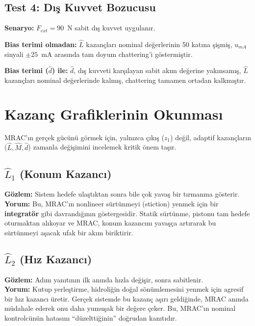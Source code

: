 \documentclass[12pt,a4paper]{article}
\begin{document}
\subsection{Test 4: Dış Kuvvet Bozucusu}

\textbf{Senaryo:} $F_{ext} = 90$~N sabit dış kuvvet uygulanır.

\textbf{Bias terimi olmadan:} $\hat{L}$ kazançları nominal değerlerinin 50 katına şişmiş, $u_{mA}$ sinyali $\pm 25$~mA arasında tam doyum chattering'i göstermiştir.

\textbf{Bias terimi ($\hat{d}$) ile:} $\hat{d}$, dış kuvveti karşılayan sabit akım değerine yakınsamış, $\hat{L}$ kazançları nominal değerlerinde kalmış, chattering tamamen ortadan kalkmıştır.

\section{Kazanç Grafiklerinin Okunması}
\label{sec:gain_analysis}

MRAC'ın gerçek gücünü görmek için, yalnızca çıkış ($z_1$) değil, adaptif kazançların ($\hat{L}, \hat{M}, \hat{d}$) zamanla değişimini incelemek kritik önem taşır.

\subsection{$\hat{L}_1$ (Konum Kazancı)}
\textbf{Gözlem:} Sistem hedefe ulaştıktan sonra bile çok yavaş bir tırmanma gösterir.\\
\textbf{Yorum:} Bu, MRAC'ın nonlineer sürtünmeyi (stiction) yenmek için bir \textbf{integratör} gibi davrandığının göstergesidir. Statik sürtünme, pistonu tam hedefe oturmaktan alıkoyar ve MRAC, konum kazancını yavaşça artırarak bu sürtünmeyi aşacak ufak bir akım biriktirir.

\subsection{$\hat{L}_2$ (Hız Kazancı)}
\textbf{Gözlem:} Adım yanıtının ilk anında hızla değişir, sonra sabitlenir.\\
\textbf{Yorum:} Kutup yerleştirme, hidroliğin doğal sönümlemesini yenmek için agresif bir hız kazancı üretir. Gerçek sistemde bu kazanç aşırı geldiğinde, MRAC anında müdahale ederek onu daha yumuşak bir değere çeker. Bu, MRAC'ın nominal kontrolcünün hatasını ``düzelttiğinin'' doğrudan kanıtıdır.
\end{document}
